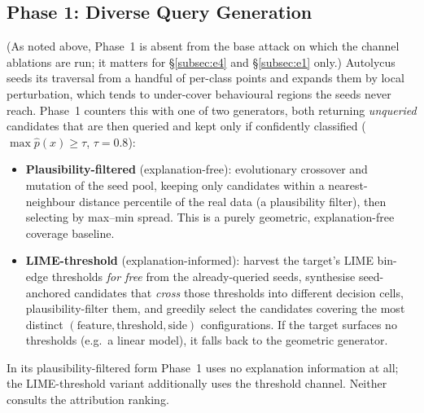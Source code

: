 \documentclass[sigconf,anonymous,review]{acmart}
\begin{document}
\subsection{Phase 1: Diverse Query Generation}
\label{subsec:diverse-note}
(As noted above, Phase~1 is absent from the base attack on which the channel ablations are run; it
matters for \S\ref{subsec:e4} and \S\ref{subsec:e1} only.)
\label{subsec:diverse}
Autolycus seeds its traversal from a handful of per-class points and expands them by
local perturbation, which tends to under-cover behavioural regions the seeds never
reach. Phase~1 counters this with one of two generators, both returning \emph{unqueried}
candidates that are then queried and kept only if confidently classified
($\max \hat{p}(x) \ge \tau$, $\tau = 0.8$):
\begin{itemize}
  \item \textbf{Plausibility-filtered} (explanation-free): evolutionary crossover and
  mutation of the seed pool, keeping only candidates within a nearest-neighbour distance
  percentile of the real data (a plausibility filter), then selecting by max--min spread.
  This is a purely geometric, explanation-free coverage baseline.
  \item \textbf{LIME-threshold} (explanation-informed): harvest the target's LIME
  bin-edge thresholds \emph{for free} from the already-queried seeds, synthesise
  seed-anchored candidates that \emph{cross} those thresholds into different decision
  cells, plausibility-filter them, and greedily select the candidates covering the most
  distinct $(\text{feature}, \text{threshold}, \text{side})$ configurations. If the
  target surfaces no thresholds (e.g.\ a linear model), it falls back to the geometric
  generator.
\end{itemize}
In its plausibility-filtered form Phase~1 uses no explanation information at all; the
LIME-threshold variant additionally uses the threshold channel. Neither consults the
attribution ranking.
\end{document}
